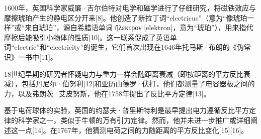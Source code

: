 1600年，英国科学家威廉·吉尔伯特对电学和磁学进行了仔细研究，将磁铁效应与摩擦琥珀产生的静电区分开来[8]。他创造了新拉丁词“electricus”（意为“像琥珀一样”或“来自琥珀”，源自希腊语单词 ἤλεκτρον [elektron]，意为“琥珀”），用来指代摩擦后能吸引小物体的性质[10]。这一联系促成了英语单词“electric”和“electricity”的诞生，它们首次出现在1646年托马斯·布朗的《伪常识》一书中[11]。

18世纪早期的研究者怀疑电力与重力一样会随距离衰减（即按距离的平方反比衰减），包括丹尼尔·伯努利[12]和亚历山德罗·伏打，他们都测量了电容器板之间的力，以及弗朗茨·艾皮努斯，他在1758年提出了反比平方定律[13]。

基于电荷球体的实验，英国的约瑟夫·普里斯特利是最早提出电力遵循反比平方定律的科学家之一，类似于牛顿的万有引力定律。然而，他并未进一步推广或详细阐述这一点[14]。在1767年，他猜测电荷之间的力随距离的平方反比变化[15][16]。
